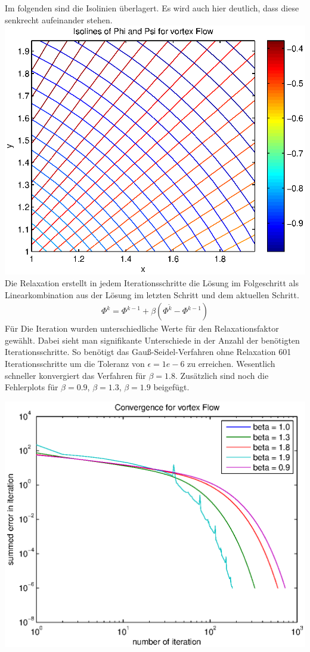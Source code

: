 \documentclass{article}
\begin{document}
Im folgenden sind die Isolinien überlagert. Es wird auch hier deutlich,
dass diese senkrecht aufeinander stehen.\\
\includegraphics[scale=0.6]{test/2vortex/both.eps}\\
Die Relaxation erstellt in jedem Iterationsschritte die Lösung im Folgeschritt als Linearkombination aus der Lösung im letzten Schritt
und dem aktuellen Schritt.
\begin{align}
\Phi^{k} = \Phi^{k-1} + \beta (\Phi^{\tilde{k}}-\Phi^{k-1})
\end{align}
Für Die Iteration wurden unterschiedliche Werte für den Relaxationsfaktor gewählt. Dabei sieht man signifikante
Unterschiede in der Anzahl der benötigten Iterationsschritte.
So benötigt das Gauß-Seidel-Verfahren ohne Relaxation 601 Iterationsschritte um die Toleranz von $\epsilon= 1e-6$ 
zu erreichen. Wesentlich schneller konvergiert das Verfahren für $\beta = 1.8$. Zusätzlich sind noch die Fehlerplots
für $\beta = 0.9$, $\beta = 1.3$, $\beta = 1.9$ beigefügt.

\includegraphics[scale=0.5]{test/2vortex/allerror.eps}
\end{document}
